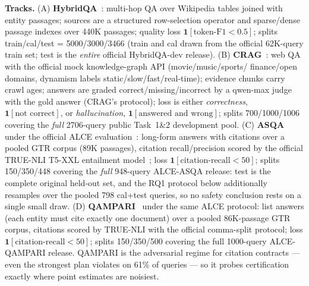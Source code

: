 \textbf{Tracks.} (A) \textbf{HybridQA}~\cite{chen2020hybridqa}: multi-hop
QA over Wikipedia tables joined with entity passages; sources are a
structured row-selection operator and sparse/dense passage indexes over
440K passages; quality loss $\mathbf{1}[\text{token-F1} < 0.5]$; splits
train/cal/test = 5000/3000/3466 (train and cal drawn from the official
62K-query train set; test is the \emph{entire} official HybridQA-dev
release).
(B) \textbf{CRAG}~\cite{yang2024cragbench}: web QA with the official mock
knowledge-graph API (movie\slash music\slash sports\slash
finance\slash open domains, dynamism
labels static\slash slow\slash fast\slash real-time); evidence chunks
carry crawl ages;
answers are graded correct\slash missing\slash incorrect by a qwen-max
judge with the
gold answer (CRAG's protocol); loss is either \emph{correctness},
$\mathbf{1}[\text{not correct}]$, or \emph{hallucination},
$\mathbf{1}[\text{answered and wrong}]$; splits 700/1000/1006 covering
the \emph{full} 2706-query public Task~1\&2 development pool.
(C) \textbf{ASQA}~\cite{stelmakh2022asqa} under the official ALCE
evaluation~\cite{gao2023alce}: long-form answers with citations over a
pooled GTR corpus (89K passages), citation recall/precision scored by the
official TRUE-NLI T5-XXL entailment model~\cite{honovich2022true}; loss
$\mathbf{1}[\text{citation-recall} < 50]$; splits 150/350/448 covering
the \emph{full} 948-query ALCE-ASQA release: test is the complete
original held-out set, and the RQ1 protocol below additionally resamples
over the pooled 798 cal+test queries, so no safety conclusion rests on a
single small draw.
(D) \textbf{QAMPARI}~\cite{amouyal2022qampari} under the same ALCE
protocol: list answers (each entity must cite exactly one document) over
a pooled 86K-passage GTR corpus, citations scored by TRUE-NLI with the
official comma-split protocol; loss
$\mathbf{1}[\text{citation-recall} < 50]$; splits 150/350/500 covering
the full 1000-query ALCE-QAMPARI release. QAMPARI is the adversarial
regime for citation contracts --- even the strongest plan violates on
61\% of queries --- so it probes certification exactly where
point estimates are noisiest.

